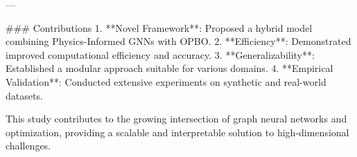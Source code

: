 ---

### Contributions  
1. **Novel Framework**: Proposed a hybrid model combining Physics-Informed GNNs with OPBO.  
2. **Efficiency**: Demonstrated improved computational efficiency and accuracy.  
3. **Generalizability**: Established a modular approach suitable for various domains.  
4. **Empirical Validation**: Conducted extensive experiments on synthetic and real-world datasets.  

This study contributes to the growing intersection of graph neural networks and optimization, providing a scalable and interpretable solution to high-dimensional challenges.